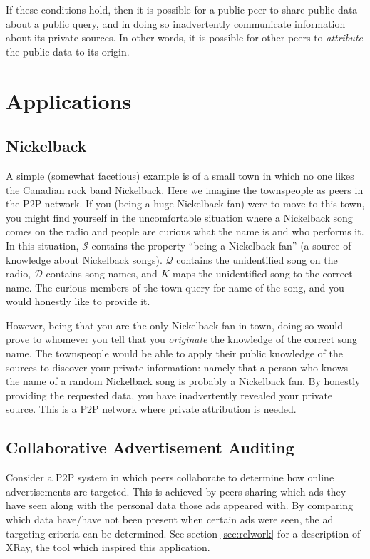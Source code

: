 \documentclass{article}
\newcommand{\secref}[1]{section \ref{sec:#1}}
\begin{document}
If these conditions hold, then it is possible for a public peer to share public
data about a public query, and in doing so inadvertently communicate information
about its private sources. In other words, it is possible for other peers to
{\it attribute} the public data to its origin.

\section{Applications}\label{sec:example}

\subsection{Nickelback}

A simple (somewhat facetious) example is of a small town in which no one likes
the Canadian rock band Nickelback. Here we imagine the townspeople as peers in
the P2P network. If you (being a huge Nickelback fan) were to move to this town,
you might find yourself in the uncomfortable situation where a Nickelback song
comes on the radio and people are curious what the name is and who performs it.
In this situation, $\mathcal{S}$ contains the property ``being a Nickelback
fan'' (a source of knowledge about Nickelback songs). $\mathcal{Q}$ contains the
unidentified song on the radio, $\mathcal{D}$ contains song names, and $K$ maps
the unidentified song to the correct name. The curious members of the town query
for name of the song, and you would honestly like to provide it.

However, being that you are the only Nickelback fan in town, doing so would
prove to whomever you tell that you {\it originate} the knowledge of the correct
song name. The townspeople would be able to apply their public knowledge of the
sources to discover your private information: namely that a person who knows the
name of a random Nickelback song is probably a Nickelback fan. By honestly
providing the requested data, you have inadvertently revealed your private
source. This is a P2P network where private attribution is needed.

\subsection{Collaborative Advertisement Auditing}\label{sec:xray}

Consider a P2P system in which peers collaborate to determine how online
advertisements are targeted. This is achieved by peers sharing which ads they
have seen along with the personal data those ads appeared with. By comparing
which data have/have not been present when certain ads were seen, the ad
targeting criteria can be determined. See \secref{relwork} for a description of
XRay, the tool which inspired this application.
\end{document}
